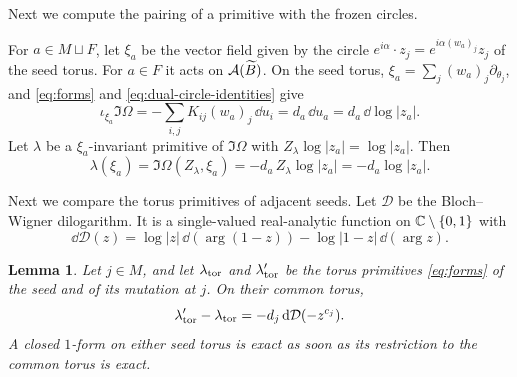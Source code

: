 \documentclass[12pt, letter]{amsart}
\newtheorem{lemma}[dummy]{Lemma}
\theoremstyle{definition}
\begin{document}
Next we compute the pairing of a primitive with the frozen circles.

For $a\in M\sqcup F$, let $\xi_a$ be the vector field given by the circle $e^{i\alpha}\cdot z_j=e^{i\alpha(w_a)_j}z_j$ of the seed torus.
For $a\in F$ it acts on $\mathcal{A}(\widetilde B)$.
On the seed torus, $\xi_a=\sum_j(w_a)_j\partial_{\theta_j}$, and \eqref{eq:forms} and \eqref{eq:dual-circle-identities} give
\begin{equation}\label{eq:frozen-hamiltonian}
 \iota_{\xi_a}\Im\Omega=-\sum_{i,j}K_{ij}(w_a)_j\,\dd u_i=d_a\,\dd u_a=d_a\,\dd\log|z_a| .
\end{equation}
Let $\lambda$ be a $\xi_a$-invariant primitive of $\Im\Omega$ with $Z_\lambda\log|z_a|=\log|z_a|$.
Then
\begin{equation}\label{eq:frozen-pairing}
 \lambda(\xi_a)=\Im\Omega(Z_\lambda,\xi_a)=-d_a\,Z_\lambda\log|z_a|=-d_a\log|z_a| .
\end{equation}


Next we compare the torus primitives of adjacent seeds.
Let $\mathcal D$ be the Bloch--Wigner dilogarithm.
It is a single-valued real-analytic function on $\mathbb{C}\setminus\{0,1\}$ with
\[
 \dd\mathcal D(z)=\log|z|\,\dd(\arg(1-z))-\log|1-z|\,\dd(\arg z) .
\]

\begin{lemma}
\label{lem:mutation-potential}
Let $j\in M$, and let $\lambda_{\mathrm{tor}}$ and $\lambda_{\mathrm{tor}}'$ be the torus primitives \eqref{eq:forms} of the seed and of its mutation at $j$.
On their common torus,
\[
 \lambda_{\mathrm{tor}}'-\lambda_{\mathrm{tor}}=-d_j\,\mathrm{d}\mathcal D(-z^{c_j}).
\]
A closed $1$-form on either seed torus is exact as soon as its restriction to the common torus is exact.
\end{lemma}
\end{document}
